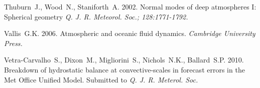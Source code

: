 \documentclass[times]{qjrms4}
\begin{document}
\begin{thebibliography}
Thuburn~J., Wood~N., Staniforth~A. 2002. Normal modes of deep atmospheres I: Spherical geometry
\emph{Q. J. R. Meteorol. Soc.; 128:1771-1792.}


Vallis~G.K. 2006. Atmospheric and oceanic fluid dynamics.
\emph{Cambridge University Press.}

Vetra-Carvalho~S., Dixon~M., Migliorini~S., Nichols~N.K., Ballard~S.P. 2010. Breakdown of hydrostatic balance at convective-scales in forecast errors in the Met Office Unified Model.
Submitted to \emph{Q. J. R. Meterol. Soc.}

\end{thebibliography}
\end{document}
